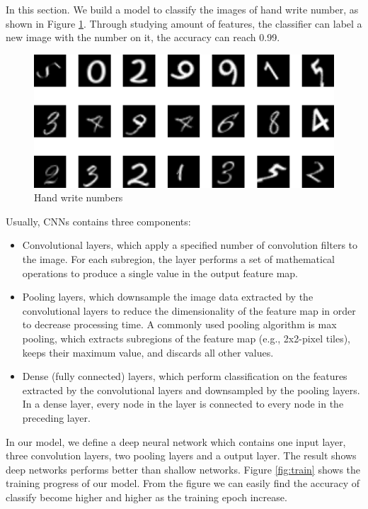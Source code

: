 In this section. We build a model to classify the images of hand write number, as shown in Figure \ref{fig:number}. Through studying amount of features, the classifier can label a new image with the number on it, the accuracy can reach 0.99.

\begin{figure}[h!]
	\centering
	\includegraphics[width=0.8\linewidth]{figures/part3/number}
	\caption{Hand write numbers}
	\label{fig:number}
\end{figure} 

Usually, CNNs contains three components:
\begin{itemize}
	\item Convolutional layers, which apply a specified number of convolution filters to the image. For each subregion, the layer performs a set of mathematical operations to produce a single value in the output feature map.
	\item Pooling layers, which downsample the image data extracted by the convolutional layers to reduce the dimensionality of the feature map in order to decrease processing time. A commonly used pooling algorithm is max pooling, which extracts subregions of the feature map (e.g., 2x2-pixel tiles), keeps their maximum value, and discards all other values.
	\item Dense (fully connected) layers, which perform classification on the features extracted by the convolutional layers and downsampled by the pooling layers. In a dense layer, every node in the layer is connected to every node in the preceding layer.
\end{itemize}

In our model, we define a deep neural network which contains one input layer, three convolution layers, two pooling layers and a output layer. The result shows deep networks performs better than shallow networks. Figure \ref{fig:train} shows the training progress of our model. From the figure we can easily find the accuracy of classify become higher and higher as the training epoch increase. 

